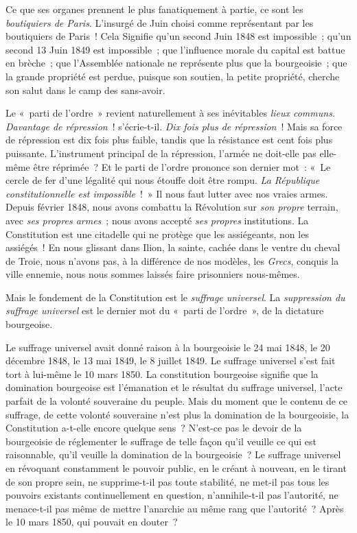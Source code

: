 \documentclass[french,twoside]{book} %
\begin{document}
Ce que ses organes prennent le plus fanatiquement à partie, ce sont les \emph{boutiquiers de Paris}. L’insurgé de Juin choisi comme représentant par les boutiquiers de Paris ! Cela Signifie qu’un second Juin 1848 est impossible ; qu’un second 13 Juin 1849 est impossible ; que l’influence morale du capital est battue en brèche ; que l’Assemblée nationale ne représente plus que la bourgeoisie ; que la grande propriété est perdue, puisque son soutien, la petite propriété, cherche son salut dans le camp des sans-avoir.\par
Le « parti de l’ordre » revient naturellement à ses inévitables \emph{lieux communs. Davantage de répression} ! s’écrie-t-il. \emph{Dix fois plus de répression} ! Mais sa force de répression est dix fois plus faible, tandis que la résistance est cent fois plus puissante. L’instrument principal de la répression, l’armée ne doit-elle pas elle-même être réprimée ? Et le parti de l’ordre prononce son dernier mot : « Le cercle de fer d’une légalité qui nous étouffe doit être rompu. \emph{La République constitutionnelle est impossible} ! » Il nous faut lutter avec nos vraies armes. Depuis février 1848, nous avons combattu la Révolution sur \emph{son propre} terrain, avec \emph{ses propres armes} ; nous avons accepté \emph{ses propres} institutions. La Constitution est une citadelle qui ne protège que les assiégeants, non les assiégés ! En nous glissant dans Ilion, la sainte, cachée dans le ventre du cheval de Troie, nous n’avons pas, à la différence de nos modèles, les \emph{Grecs}, conquis la ville ennemie, nous nous sommes laissés faire prisonniers nous-mêmes.\par
Mais le fondement de la Constitution est le \emph{suffrage universel}. La \emph{suppression du suffrage universel} est le dernier mot du « parti de l’ordre », de la dictature bourgeoise.\par
Le suffrage universel avait donné raison à la bourgeoisie le 24 mai 1848, le 20 décembre 1848, le 13 mai 1849, le 8 juillet 1849. Le suffrage universel s’est fait tort à lui-même le 10 mars 1850. La constitution bourgeoise signifie que la domination bourgeoise est l’émanation et le résultat du suffrage universel, l’acte parfait de la volonté souveraine du peuple. Mais du moment que le contenu de ce suffrage, de cette volonté souveraine n’est plus la domination de la bourgeoisie, la Constitution a-t-elle encore quelque sens ? N’est-ce pas le devoir de la bourgeoisie de réglementer le suffrage de telle façon qu’il veuille ce qui est raisonnable, qu’il veuille la domination de la bourgeoisie ? Le suffrage universel en révoquant constamment le pouvoir public, en le créant à nouveau, en le tirant de son propre sein, ne supprime-t-il pas toute stabilité, ne met-il pas tous les pouvoirs existants continuellement en question, n’annihile-t-il pas l’autorité, ne menace-t-il pas même de mettre l’anarchie au même rang que l’autorité ? Après le 10 mars 1850, qui pouvait en douter ?\par
\end{document}
